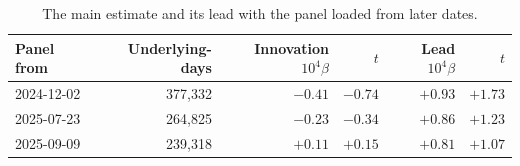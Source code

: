 \begin{table}[t]
\centering
\caption{The main estimate and its lead with the panel loaded from later dates.}
\label{tab:windows}
\begin{tabular}{lrrrrr}
\toprule
Panel from & Underlying-days & Innovation $10^4\beta$ & $t$ & Lead $10^4\beta$ & $t$ \\
\midrule
2024-12-02 & 377,332 & $-0.41$ & $-0.74$ & $+0.93$ & $+1.73$ \\
2025-07-23 & 264,825 & $-0.23$ & $-0.34$ & $+0.86$ & $+1.23$ \\
2025-09-09 & 239,318 & $+0.11$ & $+0.15$ & $+0.81$ & $+1.07$ \\
\bottomrule
\end{tabular}
\par{}
\end{table}
